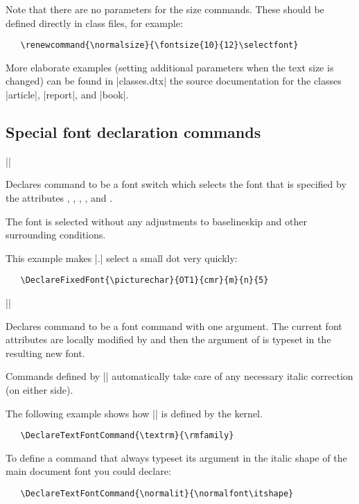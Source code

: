 \documentclass{ltxguide}[1995/11/28]
\begin{document}
Note that there are no parameters for the size commands.  These should
be defined directly in class files, for example:
\begin{verbatim}
   \renewcommand{\normalsize}{\fontsize{10}{12}\selectfont}
\end{verbatim}
More elaborate examples (setting additional parameters when the text
size is changed) can be found in |classes.dtx| the source documentation
for the classes |article|, |report|, and |book|.

\subsection{Special font declaration commands}

\begin{decl}
  |\DeclareFixedFont|    
                       
\end{decl}

Declares command  to be a font switch which selects the font that
is specified by the attributes , , ,
, and .

The font is selected without any adjustments to baselineskip and other
surrounding conditions.

This example makes |{\picturechar .}| select a small dot very quickly:
\begin{verbatim}
   \DeclareFixedFont{\picturechar}{OT1}{cmr}{m}{n}{5}
\end{verbatim}

\begin{decl}
|\DeclareTextFontCommand|  
\end{decl}

Declares command  to be a font command with one argument.  The
current font attributes are locally modified by  and
then the argument of  is typeset in the resulting new font.

Commands defined by |\DeclareTextFontCommand| automatically take care of
any necessary italic correction (on either side).

The following example shows how |\textrm| is defined by the kernel.
\begin{verbatim}
   \DeclareTextFontCommand{\textrm}{\rmfamily}
\end{verbatim}

To define a command that always typeset its argument in the italic shape
of the main document font you could declare:
\begin{verbatim}
   \DeclareTextFontCommand{\normalit}{\normalfont\itshape}
\end{verbatim}
\end{document}
